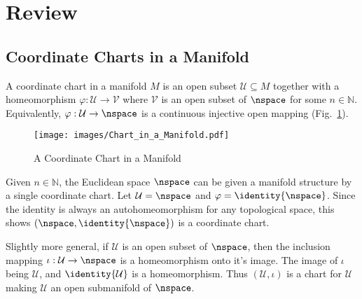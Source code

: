 \section{Review}
    \subsection{Coordinate Charts in a Manifold}
        A coordinate chart in a manifold $M$ is an open subset
        $\mathcal{U}\subseteq{M}$ together with a homeomorphism
        $\varphi:\mathcal{U}\rightarrow\mathcal{V}$ where $\mathcal{V}$
        is an open subset of $\nspace$ for some $n\in\mathbb{N}$.
        Equivalently, $\varphi:\mathcal{U}\rightarrow\nspace$ is a
        continuous injective open mapping
        (Fig.~\ref{fig:Coordinate_Chart}).
        \begin{figure}[H]
            \centering
            \captionsetup{type=figure}
            \texttt{[image: images/Chart\_in\_a\_Manifold.pdf]}
            \caption{A Coordinate Chart in a Manifold}
            \label{fig:Coordinate_Chart}
        \end{figure}
        \begin{example}
            Given $n\in\mathbb{N}$, the Euclidean space $\nspace$ can be
            given a manifold structure by a single coordinate chart. Let
            $\mathcal{U}=\nspace$ and $\varphi=\identity{\nspace}$.
            Since the identity is always an autohomeomorphism for any
            topological space, this shows $(\nspace,\identity{\nspace})$
            is a coordinate chart.
        \end{example}
        \begin{example}
            Slightly more general, if $\mathcal{U}$ is an open subset of
            $\nspace$, then the inclusion mapping
            $\iota:\mathcal{U}\rightarrow\nspace$ is a homeomorphism
            onto it's image. The image of $\iota$ being $\mathcal{U}$,
            and $\identity{\mathcal{U}}$ is a homeomorphism. Thus
            $(\mathcal{U},\iota)$ is a chart for $\mathcal{U}$ making
            $\mathcal{U}$ an open submanifold of $\nspace$.
        \end{example}
